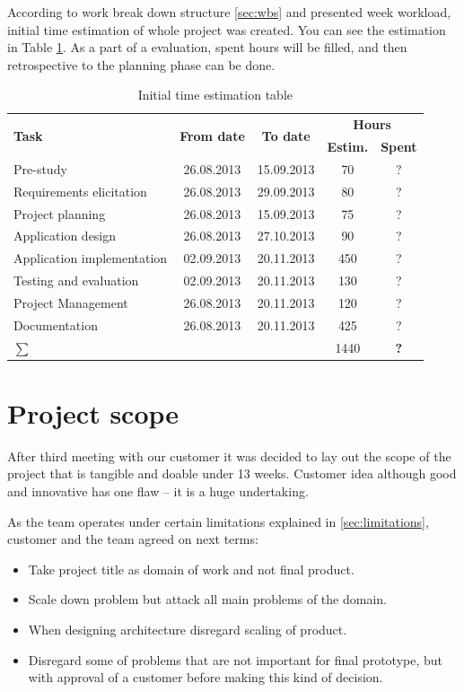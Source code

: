 According to work break down structure \ref{sec:wbs} and presented week workload, initial time estimation of whole project was created. 
You can see the estimation in Table \ref{tab:initial-time-estimation}. 
As a part of a evaluation, spent hours will be filled, and then retrospective to the planning phase can be done.

\begin{table}[!h]
	\caption{Initial time estimation table}
	\label{tab:initial-time-estimation}
	\def\arraystretch{1.25}
	\begin{tabularx}{\textwidth}{Xcccc}
		\toprule[0.5mm]
		\multirow{2}{*}{\textbf{Task}} &
		\multirow{2}{*}{\textbf{From date}} & 
		\multirow{2}{*}{\textbf{To date}} & 
		\multicolumn{2}{c}{\textbf{Hours}} \\
 				& & & \textbf{Estim.} & \textbf{Spent} \\
		\midrule
		Pre-study 					& 26.08.2013 & 15.09.2013 & 70 &  ?\\
		Requirements elicitation 	& 26.08.2013 & 29.09.2013 & 80 &  ?\\
		Project planning			& 26.08.2013 & 15.09.2013 &	75 &  ?\\
		Application design 			& 26.08.2013 & 27.10.2013 & 90 &  ?\\
		Application implementation	& 02.09.2013 & 20.11.2013 &	450 &  ?\\
		Testing and evaluation 		& 02.09.2013 & 20.11.2013 & 130 &	?\\
		Project Management  		& 26.08.2013 & 20.11.2013 & 120 &  ?\\
		Documentation				& 26.08.2013 & 20.11.2013 &	425 &  ?\\
		\midrule		
		\textbf{$\sum$}	& &	&		1440	& \textbf{?} \\								
		\bottomrule[0.5mm]
	\end{tabularx}
\end{table}


\section{Project scope}
After third meeting with our customer it was decided to lay out the scope of the project that is tangible and doable under 13 weeks. Customer idea although good and innovative has one flaw -- it is a huge undertaking.

As the team operates under certain limitations explained in \ref{sec:limitations}, customer and the team agreed on next terms:
\begin{itemize}
	\item Take project title as domain of work and not final product.
	\item Scale down problem but attack all main problems of the domain.
	\item When designing architecture disregard scaling of product.
	\item Disregard some of problems that are not important for final prototype, but with approval of a customer before making this kind of decision.
\end{itemize}

